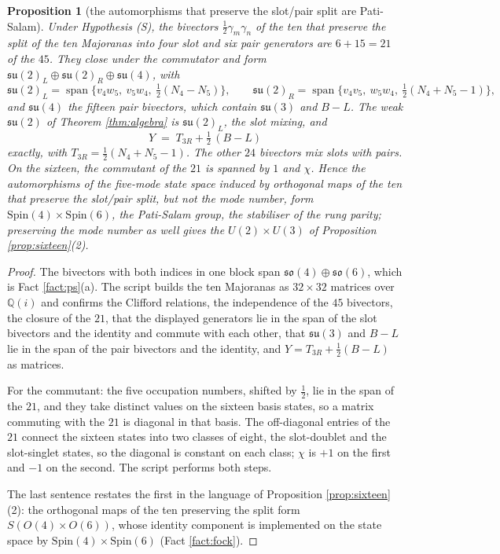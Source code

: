 \documentclass[11pt]{article}
\newtheorem{proposition}[theorem]{Proposition}
\theoremstyle{definition}
\newcommand{\su}{\mathfrak{su}}
\begin{document}
\begin{proposition}[the automorphisms that preserve the slot/pair split are Pati-Salam]\label{prop:split}
Under Hypothesis (S), the bivectors $\tfrac12\gamma_{m}\gamma_{n}$ of the ten that preserve the split of the ten Majoranas into four slot and six pair generators are $6 + 15 = 21$ of the $45$. They close under the commutator and form $\su(2)_{L} \oplus \su(2)_{R} \oplus \su(4)$, with
\[
\su(2)_{L} = \operatorname{span}\bigl\{v_{4}w_{5},\ v_{5}w_{4},\ \tfrac12(N_{4} - N_{5})\bigr\}, \qquad
\su(2)_{R} = \operatorname{span}\bigl\{v_{4}v_{5},\ w_{5}w_{4},\ \tfrac12(N_{4} + N_{5} - 1)\bigr\},
\]
and $\su(4)$ the fifteen pair bivectors, which contain $\su(3)$ and $B - L$. The weak $\su(2)$ of Theorem \ref{thm:algebra} is $\su(2)_{L}$, the slot mixing, and
\[
Y \;=\; T_{3R} + \tfrac12\,(B - L)
\]
exactly, with $T_{3R} = \tfrac12(N_{4} + N_{5} - 1)$. The other $24$ bivectors mix slots with pairs. On the sixteen, the commutant of the $21$ is spanned by $1$ and $\chi$. Hence the automorphisms of the five-mode state space induced by orthogonal maps of the ten that preserve the slot/pair split, but not the mode number, form $\mathrm{Spin}(4) \times \mathrm{Spin}(6)$, the Pati-Salam group, the stabiliser of the rung parity; preserving the mode number as well gives the $U(2) \times U(3)$ of Proposition \ref{prop:sixteen}(2).
\end{proposition}

\begin{proof}
The bivectors with both indices in one block span $\mathfrak{so}(4) \oplus \mathfrak{so}(6)$, which is Fact \ref{fact:ps}(a). The script builds the ten Majoranas as $32 \times 32$ matrices over $\mathbb{Q}(i)$ and confirms the Clifford relations, the independence of the $45$ bivectors, the closure of the $21$, that the displayed generators lie in the span of the slot bivectors and the identity and commute with each other, that $\su(3)$ and $B - L$ lie in the span of the pair bivectors and the identity, and $Y = T_{3R} + \tfrac12(B - L)$ as matrices.

For the commutant: the five occupation numbers, shifted by $\tfrac12$, lie in the span of the $21$, and they take distinct values on the sixteen basis states, so a matrix commuting with the $21$ is diagonal in that basis. The off-diagonal entries of the $21$ connect the sixteen states into two classes of eight, the slot-doublet and the slot-singlet states, so the diagonal is constant on each class; $\chi$ is $+1$ on the first and $-1$ on the second. The script performs both steps.

The last sentence restates the first in the language of Proposition \ref{prop:sixteen}(2): the orthogonal maps of the ten preserving the split form $S(O(4) \times O(6))$, whose identity component is implemented on the state space by $\mathrm{Spin}(4) \times \mathrm{Spin}(6)$ (Fact \ref{fact:fock}).
\end{proof}
\end{document}
